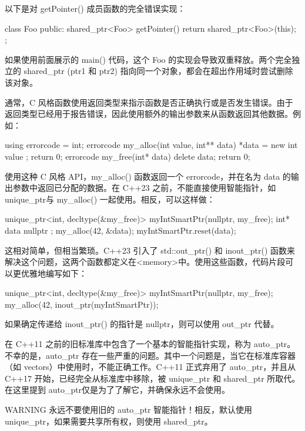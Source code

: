 以下是对 getPointer() 成员函数的完全错误实现：

\begin{cpp}
class Foo
{
    public:
        shared_ptr<Foo> getPointer() {
            return shared_ptr<Foo>(this);
        }
};
\end{cpp}

如果使用前面展示的 main() 代码，这个 Foo 的实现会导致双重释放。两个完全独立的 shared\_ptr (ptr1 和 ptr2) 指向同一个对象，都会在超出作用域时尝试删除该对象。



通常，C 风格函数使用返回类型来指示函数是否正确执行或是否发生错误。由于返回类型已经用于报告错误，因此使用额外的输出参数来从函数返回其他数据。例如：

\begin{cpp}
using errorcode = int;
errorcode my_alloc(int value, int** data) { *data = new int { value }; return 0; }
errorcode my_free(int* data) { delete data; return 0; }
\end{cpp}

使用这种 C 风格 API，my\_alloc() 函数返回一个 errorcode，并在名为 data 的输出参数中返回已分配的数据。在 C++23 之前，不能直接使用智能指针，如 unique\_ptr与 my\_alloc() 一起使用。相反，可以这样做：

\begin{cpp}
unique_ptr<int, decltype(&my_free)> myIntSmartPtr(nullptr, my_free);
int* data { nullptr };
my_alloc(42, &data);
myIntSmartPtr.reset(data);
\end{cpp}

这相对简单，但相当繁琐。C++23 引入了 std::out\_ptr() 和 inout\_ptr() 函数来解决这个问题，这两个函数都定义在<memory>中。使用这些函数，代码片段可以更优雅地编写如下：

\begin{cpp}
unique_ptr<int, decltype(&my_free)> myIntSmartPtr(nullptr, my_free);
my_alloc(42, inout_ptr(myIntSmartPtr));
\end{cpp}

如果确定传递给 inout\_ptr() 的指针是 nullptr，则可以使用 out\_ptr 代替。


在 C++11 之前的旧标准库中包含了一个基本的智能指针实现，称为 auto\_ptr。不幸的是，auto\_ptr 存在一些严重的问题。其中一个问题是，当它在标准库容器（如 vectors）中使用时，不能正确工作。C++11 正式弃用了 auto\_ptr，并且从 C++17 开始，已经完全从标准库中移除，被 unique\_ptr 和 shared\_ptr 所取代。在这里提到 auto\_ptr仅是为了了解它，并确保永远不会使用。

\begin{myWarning}{WARNING}
永远不要使用旧的 auto\_ptr 智能指针！相反，默认使用 unique\_ptr，如果需要共享所有权，则使用 shared\_ptr。
\end{myWarning}
